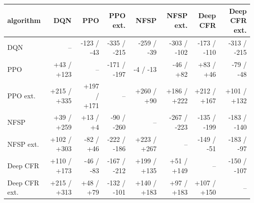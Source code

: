 \begin{tabular}{lrrrrrrr}
\toprule
algorithm & DQN & PPO & PPO ext. & NFSP & NFSP ext. & Deep CFR & Deep CFR ext. \\
\midrule
DQN & -- & -123 / -43 & -335 / -215 & -259 / -39 & -303 / -102 & -173 / -110 & -313 / -215 \\
PPO & +43 / +123 & -- & -171 / -197 & -4 / -13 & -46 / +82 & +83 / +46 & -79 / -48 \\
PPO ext. & +215 / +335 & +197 / +171 & -- & +260 / +90 & +186 / +222 & +212 / +167 & +101 / +132 \\
NFSP & +39 / +259 & +13 / +4 & -90 / -260 & -- & -267 / -223 & -135 / -199 & -183 / -140 \\
NFSP ext. & +102 / +303 & -82 / +46 & -222 / -186 & +223 / +267 & -- & -149 / -51 & -183 / -97 \\
Deep CFR & +110 / +173 & -46 / -83 & -167 / -212 & +199 / +135 & +51 / +149 & -- & -150 / -107 \\
Deep CFR ext. & +215 / +313 & +48 / +79 & -132 / -101 & +140 / +183 & +97 / +183 & +107 / +150 & -- \\
\bottomrule
\end{tabular}
